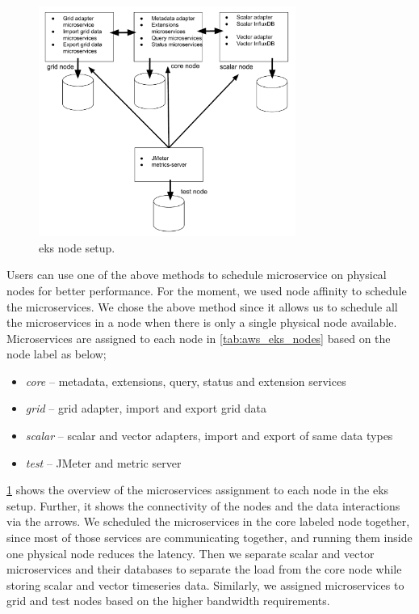 \begin{figure}[htp]
    \centering
    \includegraphics[width=0.75\textwidth]{results/work_load/eks_node_setup.pdf}
    \caption{\acrfull{eks} node setup.}
    \label{fi:eks_node_setup}
\end{figure}

Users can use one of the above methods to schedule microservice on physical nodes for better performance. For the moment, we used node affinity to schedule the microservices. We chose the above method since it allows us to schedule all the microservices in a node when there is only a single physical node available. Microservices are assigned to each node in \cref{tab:aws_eks_nodes} based on the node label as below;
\begin{itemize}
    \item \emph{core} -- metadata, extensions, query, status and extension services
    \item \emph{grid} -- grid adapter, import and export grid data
    \item \emph{scalar} -- scalar and vector adapters, import and export of same data types
    \item \emph{test} --  JMeter and metric server
\end{itemize}
\cref{fi:eks_node_setup} shows the overview of the microservices assignment to each node in the \acrshort{eks} setup. Further, it shows the connectivity of the nodes and the data interactions via the arrows. We scheduled the microservices in the core labeled node together, since most of those services are communicating together, and running them inside one physical node reduces the latency. Then we separate scalar and vector microservices and their databases to separate the load from the core node while storing scalar and vector timeseries data. Similarly, we assigned microservices to grid and test nodes based on the higher bandwidth requirements.
